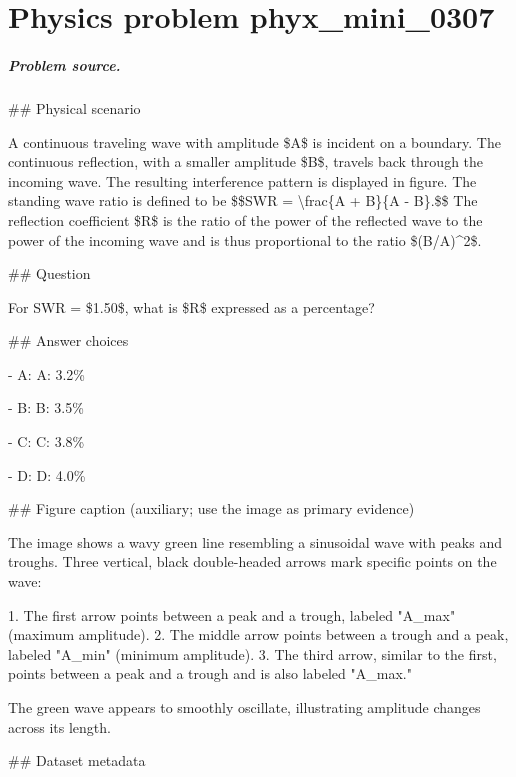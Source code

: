 
\chapter{Physics problem phyx\_mini\_0307}
\label{ch:PhyXMiniProblems_problem_phyx_mini_0307}

\paragraph{Problem source.}
\#\# Physical scenario

A continuous traveling wave with amplitude \$A\$ is incident on a boundary. The continuous reflection, with a smaller amplitude \$B\$, travels back through the incoming wave. The resulting interference pattern is displayed in figure. The standing wave ratio is defined to be \$\$SWR = \textbackslash{}frac\{A + B\}\{A - B\}.\$\$ The reflection coefficient \$R\$ is the ratio of the power of the reflected wave to the power of the incoming wave and is thus proportional to the ratio \$(B/A)\textasciicircum{}2\$.

\#\# Question

For SWR = \$1.50\$, what is \$R\$ expressed as a percentage?

\#\# Answer choices

- A: A: 3.2\%

- B: B: 3.5\%

- C: C: 3.8\%

- D: D: 4.0\%

\#\# Figure caption (auxiliary; use the image as primary evidence)

The image shows a wavy green line resembling a sinusoidal wave with peaks and troughs. Three vertical, black double-headed arrows mark specific points on the wave:

1. The first arrow points between a peak and a trough, labeled "A\_max" (maximum amplitude).
2. The middle arrow points between a trough and a peak, labeled "A\_min" (minimum amplitude).
3. The third arrow, similar to the first, points between a peak and a trough and is also labeled "A\_max."

The green wave appears to smoothly oscillate, illustrating amplitude changes across its length.

\#\# Dataset metadata

